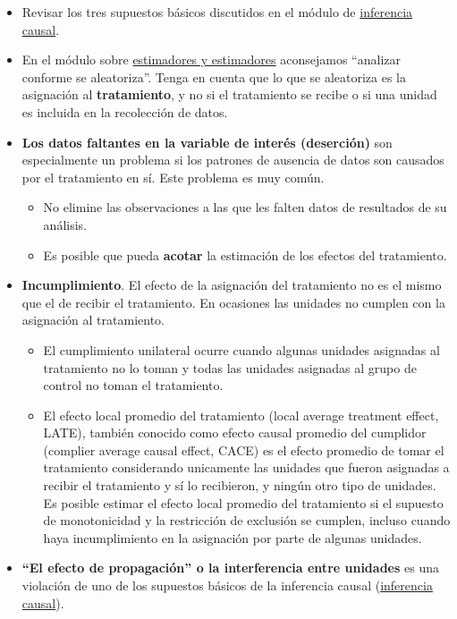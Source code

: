 \documentclass[12pt,spanish,]{book}
\begin{document}
\begin{itemize}
\item
  Revisar los tres supuestos básicos discutidos en el módulo de \href{inferencia-causal.html}{inferencia causal}.
\item
  En el módulo sobre \href{estimandos-y-estimadores.html}{estimadores y estimadores} aconsejamos ``analizar conforme se aleatoriza''. Tenga en cuenta que lo que se aleatoriza es la asignación al \textbf{tratamiento}, y no si el tratamiento se recibe o si una unidad es incluida en la recolección de datos.
\item
  \textbf{Los datos faltantes en la variable de interés (deserción)} son especialmente un problema si los patrones de ausencia de datos son causados por el tratamiento en sí. Este problema es muy común.

  \begin{itemize}
  \item
    No elimine las observaciones a las que les falten datos de resultados de su análisis.
  \item
    Es posible que pueda \textbf{acotar} la estimación de los efectos del tratamiento.
  \end{itemize}
\item
  \textbf{Incumplimiento}. El efecto de la asignación del tratamiento no es el mismo que el de recibir el tratamiento. En ocasiones las unidades no cumplen con la asignación al tratamiento.

  \begin{itemize}
  \item
    El cumplimiento unilateral ocurre cuando algunas unidades asignadas al tratamiento no lo toman y todas las unidades asignadas al grupo de control no toman el tratamiento.
  \item
    El efecto local promedio del tratamiento (local average treatment effect, LATE), también conocido como efecto causal promedio del cumplidor (complier average causal effect, CACE) es el efecto promedio de tomar el tratamiento considerando unicamente las unidades que fueron asignadas a recibir el tratamiento y sí lo recibieron, y ningún otro tipo de unidades. Es posible estimar el efecto local promedio del tratamiento si el supuesto de monotonicidad y la restricción de exclusión se cumplen, incluso cuando haya incumplimiento en la asignación por parte de algunas unidades.
  \end{itemize}
\item
  \textbf{``El efecto de propagación'' o la interferencia entre unidades} es una violación de uno de los supuestos básicos de la inferencia causal (\href{causalinference.html}{inferencia causal}).


\end{itemize}
\end{document}
